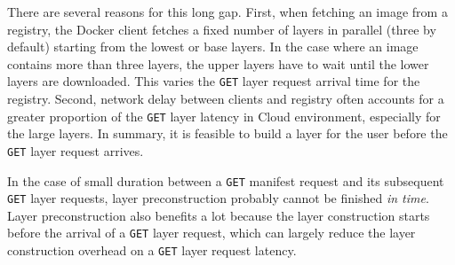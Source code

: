 There are several reasons for this long gap.
%
First, when fetching an image from a registry,
the Docker client fetches a fixed number of layers in parallel (three by
default) starting from the lowest or base layers.
%
In the case where an image
contains more than three layers, the upper layers have to wait until the
lower layers are downloaded.
%
This varies the \texttt{GET} layer request arrival time for the registry.
%
Second, network delay between clients and registry
often accounts for a greater proportion of the \texttt{GET} layer latency in Cloud
environment, especially for the large layers.
%
In summary, it is feasible to build a layer for the user before
the \texttt{GET} layer request arrives.


In the case of small duration between a \texttt{GET} manifest request
and its subsequent \texttt{GET} layer requests,
layer preconstruction probably cannot be finished \emph{in time}. 
Layer preconstruction also benefits a lot because
the layer construction starts before the arrival of a \texttt{GET} layer request,
which can largely reduce the layer construction overhead on 
a \texttt{GET} layer request latency.

